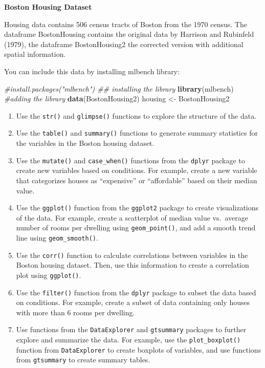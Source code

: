 \documentclass[
]{book}
\newenvironment{Shaded}{\begin{snugshade}}{\end{snugshade}}
\newcommand{\CommentTok}[1]{\textcolor[rgb]{0.56,0.35,0.01}{\textit{#1}}}
\newcommand{\FunctionTok}[1]{\textcolor[rgb]{0.13,0.29,0.53}{\textbf{#1}}}
\newcommand{\NormalTok}[1]{#1}
\newcommand{\OtherTok}[1]{\textcolor[rgb]{0.56,0.35,0.01}{#1}}
\begin{document}
\textbf{Boston Housing Dataset}

Housing data contains 506 census tracts of Boston from the 1970 census. The dataframe BostonHousing contains the original data by Harrison and Rubinfeld (1979), the dataframe BostonHousing2 the corrected version with additional spatial information.

You can include this data by installing mlbench library:

\begin{Shaded}
\begin{Highlighting}[]
\CommentTok{\#install.packages("mlbench") \#\# installing the library}
\FunctionTok{library}\NormalTok{(mlbench) }\CommentTok{\#adding the library}
\FunctionTok{data}\NormalTok{(BostonHousing2)}
\NormalTok{housing }\OtherTok{\textless{}{-}}\NormalTok{ BostonHousing2}
\end{Highlighting}
\end{Shaded}

\begin{enumerate}
\def\labelenumi{\arabic{enumi}.}
\item
  Use the \texttt{str()} and \texttt{glimpse()} functions to explore the structure of the data.
\item
  Use the \texttt{table()} and \texttt{summary()} functions to generate summary statistics for the variables in the Boston housing dataset.
\item
  Use the \texttt{mutate()} and \texttt{case\_when()} functions from the \texttt{dplyr} package to create new variables based on conditions. For example, create a new variable that categorizes houses as ``expensive'' or ``affordable'' based on their median value.
\item
  Use the \texttt{ggplot()} function from the \texttt{ggplot2} package to create visualizations of the data. For example, create a scatterplot of median value vs.~average number of rooms per dwelling using \texttt{geom\_point()}, and add a smooth trend line using \texttt{geom\_smooth()}.
\item
  Use the \texttt{corr()} function to calculate correlations between variables in the Boston housing dataset. Then, use this information to create a correlation plot using \texttt{ggplot()}.
\item
  Use the \texttt{filter()} function from the \texttt{dplyr} package to subset the data based on conditions. For example, create a subset of data containing only houses with more than 6 rooms per dwelling.
\item
  Use functions from the \texttt{DataExplorer} and \texttt{gtsummary} packages to further explore and summarize the data. For example, use the \texttt{plot\_boxplot()} function from \texttt{DataExplorer} to create boxplots of variables, and use functions from \texttt{gtsummary} to create summary tables.
\end{enumerate}
\end{document}
